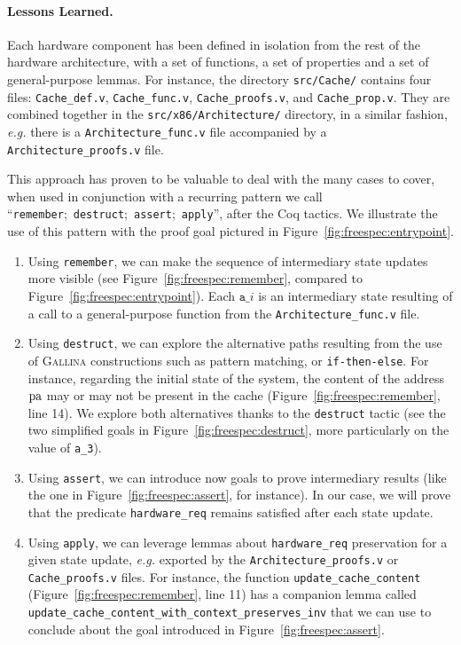 \paragraph{Lessons Learned.}
%
%
Each hardware component has been defined in isolation from the rest of the
hardware architecture, with a set of functions, a set of properties and a set of
general-purpose lemmas.
%
For instance, the directory \texttt{src/Cache/} contains four files:
\texttt{Cache\_def.v}, \texttt{Cache\_func.v}, \texttt{Cache\_proofs.v}, and
\texttt{Cache\_prop.v}.
%
They are combined together in the \texttt{src/x86/Architecture/} directory, in a
similar fashion, \emph{e.g.} there is a \texttt{Architecture\_func.v} file
accompanied by a \texttt{Architecture\_proofs.v} file. 

This approach has proven to be valuable to deal with the many cases to cover,
when used in conjunction with a recurring pattern we call
``\texttt{remember};~\texttt{destruct};~\texttt{assert};~\texttt{apply}'', after
the Coq tactics.
%
We illustrate the use of this pattern with the proof goal pictured in
Figure~\ref{fig:freespec:entrypoint}.
%
\begin{enumerate}
\item Using \texttt{remember}, we can make the sequence of intermediary state
  updates more visible (see Figure~\ref{fig:freespec:remember}, compared to
  Figure~\ref{fig:freespec:entrypoint}).
  Each \( \mathtt{a\_}i \) is an intermediary state resulting of a call to a
  general-purpose function from the \texttt{Architecture\_func.v} file.
\item Using \texttt{destruct}, we can explore the alternative paths resulting
  from the use of {\scshape Gallina} constructions such as pattern matching, or
  \texttt{if-then-else}.
  For instance, regarding the initial state of the system, the content of the
  address \( \mathrm{pa} \) may or may not be present in the cache
  (Figure~\ref{fig:freespec:remember}, line 14).
  We explore both alternatives thanks to the \texttt{destruct} tactic (see the
  two simplified goals in Figure~\ref{fig:freespec:destruct}, more particularly
  on the value of \texttt{a\_3}).
\item Using \texttt{assert}, we can introduce now goals to prove intermediary
  results (like the one in Figure~\ref{fig:freespec:assert}, for instance).
  In our case, we will prove that the predicate \texttt{hardware\_req} remains
  satisfied after each state update.
\item Using \texttt{apply}, we can leverage lemmas about \texttt{hardware\_req}
  preservation for a given state update, \emph{e.g.} exported by the
  \texttt{Architecture\_proofs.v} or \texttt{Cache\_proofs.v} files.
  For instance, the function \texttt{update\_cache\_content}
  (Figure~\ref{fig:freespec:remember}, line 11) has a companion lemma called
  \texttt{update\_cache\_content\-\_with\_context\_preserves\_inv} that we can
  use to conclude about the goal introduced in Figure~\ref{fig:freespec:assert}.
\end{enumerate}

